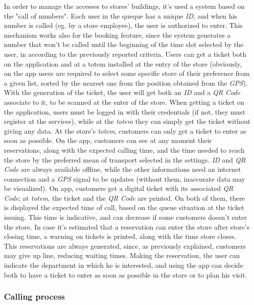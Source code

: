 \documentclass{article}
\begin{document}
		In order to manage the accesses to stores' buildings, it's used a system based on the "call of numbers". Each user in the queque has a unique \emph{ID}, and when his number is called (eg. by a store employee), the user is authorized to enter. This mechanism works also for the booking feature, since the system generates a number that won't be called until the beginning of the time slot selected by the user, in according to the previously reported criteria. Users can get a ticket both on the application and at a totem installed at the entry of the store (obviously, on the app users are required to select some specific store of their preference from a given list, sorted by the nearest one from the position obtained from the \emph{GPS}). With the generation of the ticket, the user will get both an \emph{ID} and a \emph{QR Code} associate to it, to be scanned at the enter of the store. When getting a ticket on the application, users must be logged in with their credentials (if not, they must register at the services), while at the \emph{totem} they can simply get the ticket without giving any data. At the store's \emph{totem}, customers can only get a ticket to enter as soon as possible. On the app, customers can see at any moment their reservations, along with the expected calling time, and the time needed to reach the store by the preferred mean of transport selected in the settings. \emph{ID} and \emph{QR Code} are always available offline, while the other informations need an internet connection and a \emph{GPS} signal to be updates (without them, inaccurate data may be visualized). On app, customers get a digital ticket with its associated \emph{QR Code}; at \emph{totem}, the ticket and the \emph{QR Code} are printed. On both of them, there is displayed the expected time of call, based on the queue situation at the ticket issuing. This time is indicative, and can decrease if some customers doesn't enter the store. In case it's estimated that a reservation can enter the store after store's closing time, a warning on tickets is printed, along with the time store closes. This reservations are always generated, since, as previously explained, customers may give up line, reducing waiting times. Making the reservation, the user can indicate the department in which he is interested, and using the app can decide both to have a ticket to enter as soon as possible in the store or to plan his visit. 
		
		\subsubsection{Calling process}
		
\end{document}
